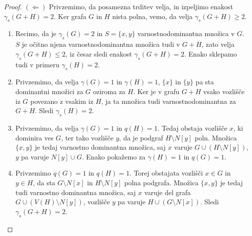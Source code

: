 \documentclass[12pt,a4paper,twoside]{article}
\theoremstyle{definition} %
\theoremstyle{plain} %
\numberwithin{equation}{section}  %
\begin{document}
\begin{proof}
\medskip
$(\Leftarrow)$ Privzemimo, da posamezna trditev velja, in izpeljimo enakost $\gamma_s(G + H) = 2$. Ker grafa $G$ in $H$ nista polna, vemo, da velja $\gamma_s(G + H) \geq 2$.
\begin{enumerate}[label=($\roman*)$]
\item Recimo, da je $\gamma_s(G) = 2$ in $S = \{x,y\}$ varnostnodominantna množica v $G$. $S$ je očitno njena varnostnodominantna množica tudi v $G + H$, zato velja $\gamma_s(G + H) \leq 2$, iz česar sledi enakost $\gamma_s(G + H) = 2$. Enako sklepamo tudi v primeru $\gamma_s(H) = 2$.
\item Privzemimo, da velja $\gamma(G) = 1$ in $\gamma(H) = 1$, $\{x\}$ in $\{y\}$ pa sta dominantni množici za $G$ oziroma za $H$. Ker je v grafu $G + H$ vsako vozlišče iz $G$ povezano z vsakim iz $H$, ja ta množica tudi varnostnodominantna za $G + H$. Sledi $\gamma_s(H) = 2$.
\item Privzemimo, da velja $\gamma(G) = 1$ in $q(H) = 1$. Tedaj obstaja vozlišče $x$, ki dominira ves $G$, ter tako vozlišče $y$, da je podgraf $H \setminus N[y]$ poln. Množica $\{x,y\}$ je tedaj varnostno dominantna množica, saj $x$ varuje $G \cup (H \setminus N[y])$, $y$ pa varuje $N[y] \cup G$. Enako pokažemo za $\gamma(H) = 1$ in $q(G) = 1$.
\item Privzemimo $q(G) = 1$ in $q(H) = 1$. Torej obstajata vozlišči $x \in G$ in $y \in H$, da sta $G \setminus N[x]$ in $H \setminus N[y]$ polna podgrafa. Množica $\{x,y\}$ je tedaj tudi varnostno dominantna množica, saj $x$ varuje del grafa $G \cup (V(H) \setminus N[y])$, vozlišče $y$ pa varuje $H \cup (G \setminus N[x])$. Sledi $\gamma_s(G + H) = 2$.\qedhere
\end{enumerate}
\end{proof}
\end{document}
